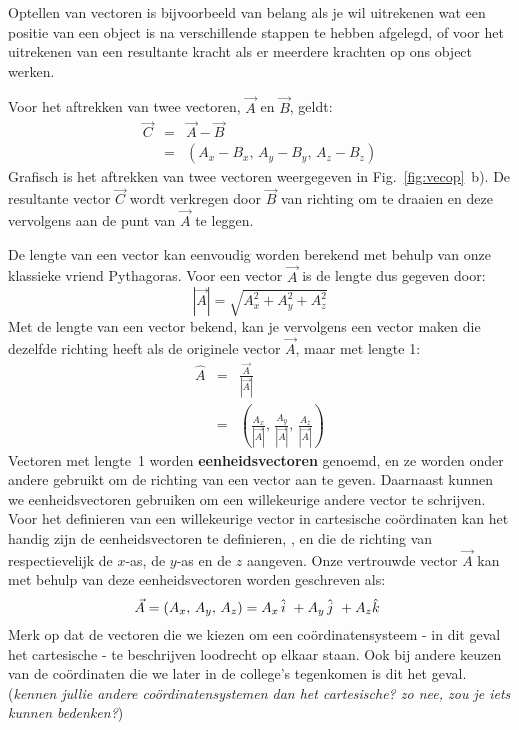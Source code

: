 Optellen van vectoren is bijvoorbeeld van belang
als je wil uitrekenen wat een positie van een object is na verschillende stappen te hebben
afgelegd, of voor het uitrekenen van een resultante kracht als er meerdere krachten op
ons object werken.

Voor het aftrekken van twee vectoren, $\vec{A}$ en $\vec{B}$, geldt:
\begin{eqnarray}
\vec{C} & = & \vec{A} - \vec{B} \\
              & = & (A_x - B_x,\, A_y - B_y, \,A_z - B_z) 
\end{eqnarray}
Grafisch is het aftrekken van twee vectoren weergegeven in Fig.~\ref{fig:vecop}~b). De resultante
vector $\vec{C}$ wordt verkregen door $\vec{B}$ van richting om te draaien en deze vervolgens
aan de punt van $\vec{A}$ te leggen.

De lengte van een vector kan eenvoudig worden berekend met behulp van onze klassieke
vriend Pythagoras. Voor een vector $\vec{A}$ is de lengte dus gegeven door:
\begin{equation}
|\vec{A}|  = \sqrt{A_x^2+A_y^2+A_z^2}  
\end{equation}
Met de lengte van een vector bekend, kan je vervolgens een vector maken die dezelfde
richting heeft als de originele vector $\vec{A}$, maar met lengte 1:
\begin{eqnarray}
\hat{A} & = & \frac{\vec{A}}{|\vec{A}|} \\
             & = & \left(\frac{A_x}{|\vec{A}|},\, \frac{A_y}{|\vec{A}|},\, \frac{A_z}{|\vec{A}|}\right)
\end{eqnarray}
Vectoren met lengte~1 worden {\bf eenheidsvectoren} genoemd, en ze worden onder andere
gebruikt om de richting van een vector aan te geven. Daarnaast kunnen we eenheidsvectoren gebruiken om een willekeurige andere vector te schrijven. Voor het definieren van een willekeurige vector in cartesische co\"{o}rdinaten kan het handig zijn de eenheidsvectoren te definieren, \ihat, \jhat en \khat die de richting van respectievelijk de $x$-as, de $y$-as en de $z$ aangeven.  Onze vertrouwde vector $\vec{A}$ kan met behulp van deze eenheidsvectoren worden geschreven als:
\begin{equation}
\vec{A} = (A_x,\,A_y,\,A_z) = A_x\,\hat{i}~ + A_y \, \hat{j}~ + A_z \hat{k}~
\end{equation}
Merk op dat de vectoren die we kiezen om een co\"{o}rdinatensysteem - in dit geval het cartesische - te beschrijven loodrecht op elkaar staan.  Ook bij andere keuzen van de co\"{o}rdinaten die we later in de college's tegenkomen is dit het geval. ({\it kennen jullie andere co\"{o}rdinatensystemen dan het cartesische? zo nee, zou je iets kunnen bedenken?})

